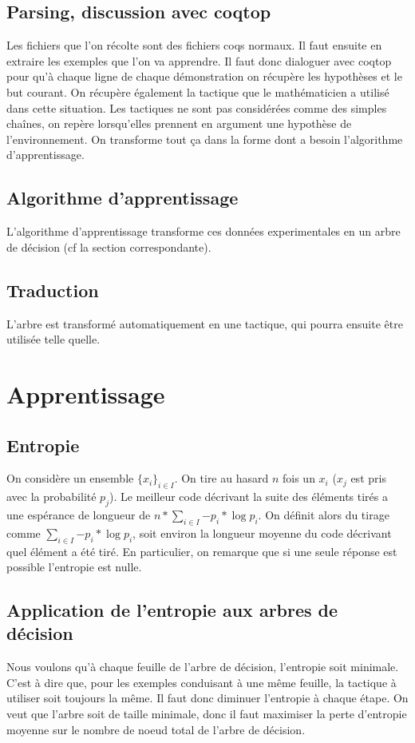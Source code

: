   \subsection{Parsing, discussion avec coqtop}
  Les fichiers que l'on récolte sont des fichiers coqs normaux. Il faut ensuite en extraire les exemples que l'on va apprendre. Il faut donc dialoguer avec coqtop pour qu'à chaque ligne de chaque démonstration on récupère les hypothèses et le but courant. On récupère également la tactique que le mathématicien a utilisé dans cette situation. Les tactiques ne sont pas considérées comme des simples chaînes, on repère lorsqu'elles prennent en argument une hypothèse de l'environnement. On transforme tout ça dans la forme dont a besoin l'algorithme d'apprentissage.

  \subsection{Algorithme d'apprentissage} 
  L'algorithme d'apprentissage transforme ces données experimentales en un arbre de décision (cf la section correspondante).

  \subsection{Traduction}
  L'arbre est transformé automatiquement en une tactique, qui pourra ensuite être utilisée telle quelle.


\section{Apprentissage}
\subsection{Entropie}
On considère un ensemble $\{x_i\}_{i \in I}$. On tire au hasard $n$ fois un $x_i$ ($x_j$ est pris avec la probabilité $p_j$). Le meilleur code décrivant la suite des éléments tirés a une espérance de longueur de $n * \sum_{i \in I}{- p_i * \log{p_i}}$. On définit alors  du tirage comme $ \sum_{i \in I}{- p_i * \log{p_i}}$, soit environ la longueur moyenne du code décrivant quel élément a été tiré. En particulier, on remarque que si une seule réponse est possible l'entropie est nulle.

\subsection{Application de l'entropie aux arbres de décision}
Nous voulons qu'à chaque feuille de l'arbre de décision, l'entropie soit minimale. C'est à dire que, pour les exemples conduisant à une même feuille, la tactique à utiliser soit toujours la même. Il faut donc diminuer l'entropie à chaque étape. On veut que l'arbre soit de taille minimale, donc il faut maximiser la perte d'entropie moyenne sur le nombre de noeud total de l'arbre de décision.\\

